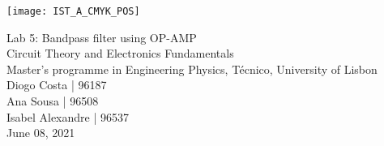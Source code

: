 
\thispagestyle {empty}

\texttt{[image: IST\_A\_CMYK\_POS]}

\begin{center}
%
\vspace{1.0cm}

\vspace{1cm}
{\FontLb \Huge Lab 5: Bandpass filter using OP-AMP} \\ %
\vspace{1cm}
{\FontSn \Large Circuit Theory and Electronics Fundamentals} \\ %
{\FontSn \large Master's programme in Engineering Physics, Técnico, University of Lisbon} \\ %
\vspace{1cm}
{\FontSn Diogo Costa | 96187} \\
{\FontSn Ana Sousa | 96508} \\
{\FontSn Isabel Alexandre | 96537} \\
\vspace{1cm}
{\FontSn June 08, 2021} \\ %
%
\end{center}


